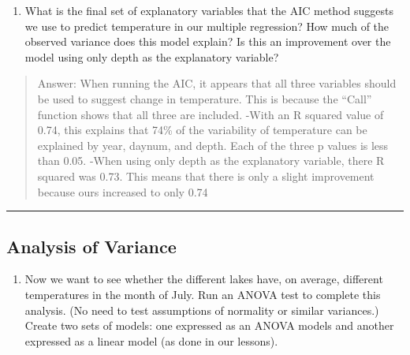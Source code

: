 \documentclass[
]{article}
\newenvironment{Shaded}{\begin{snugshade}}{\end{snugshade}}
\newcommand{\CommentTok}[1]{\textcolor[rgb]{0.56,0.35,0.01}{\textit{#1}}}
\newcommand{\DataTypeTok}[1]{\textcolor[rgb]{0.13,0.29,0.53}{#1}}
\newcommand{\KeywordTok}[1]{\textcolor[rgb]{0.13,0.29,0.53}{\textbf{#1}}}
\newcommand{\NormalTok}[1]{#1}
\newcommand{\OperatorTok}[1]{\textcolor[rgb]{0.81,0.36,0.00}{\textbf{#1}}}
\newcommand{\StringTok}[1]{\textcolor[rgb]{0.31,0.60,0.02}{#1}}
\providecommand{\tightlist}{%
  \setlength{\itemsep}{0pt}\setlength{\parskip}{0pt}}
\begin{document}
\begin{enumerate}
\def\labelenumi{\arabic{enumi}.}
\setcounter{enumi}{10}
\tightlist
\item
  What is the final set of explanatory variables that the AIC method
  suggests we use to predict temperature in our multiple regression? How
  much of the observed variance does this model explain? Is this an
  improvement over the model using only depth as the explanatory
  variable?
\end{enumerate}

\begin{quote}
Answer: When running the AIC, it appears that all three variables should
be used to suggest change in temperature. This is because the ``Call''
function shows that all three are included. -With an R squared value of
0.74, this explains that 74\% of the variability of temperature can be
explained by year, daynum, and depth. Each of the three p values is less
than 0.05. -When using only depth as the explanatory variable, there R
squared was 0.73. This means that there is only a slight improvement
because ours increased to only 0.74
\end{quote}

\begin{center}\rule{0.5\linewidth}{0.5pt}\end{center}

\hypertarget{analysis-of-variance}{%
\subsection{Analysis of Variance}\label{analysis-of-variance}}

\begin{enumerate}
\def\labelenumi{\arabic{enumi}.}
\setcounter{enumi}{11}
\tightlist
\item
  Now we want to see whether the different lakes have, on average,
  different temperatures in the month of July. Run an ANOVA test to
  complete this analysis. (No need to test assumptions of normality or
  similar variances.) Create two sets of models: one expressed as an
  ANOVA models and another expressed as a linear model (as done in our
  lessons).
\end{enumerate}

\begin{Shaded}
\end{Shaded}
\end{document}
